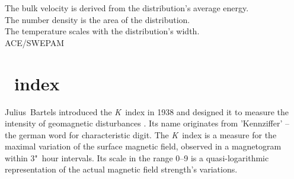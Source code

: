 The bulk velocity is derived from the distribution's average energy.\\
The number density is the area of the distribution.\\
The temperature scales with the distribution's width.\\


ACE/SWEPAM\\	%


\section{\Kp{}~index}
\label{sec:kp_index}
Julius~Bartels introduced the \textit{K}~index in 1938 and designed it to measure the intensity of geomagnetic disturbances \citep{Bartels1939}. Its name originates from 'Kennziffer' -- the german word for characteristic digit. The \textit{K}~index is a measure for the maximal variation of the surface magnetic field, observed in a magnetogram within 3"~hour intervals. Its scale in the range 0--9 is a quasi-logarithmic representation of the actual magnetic field strength's variations.

